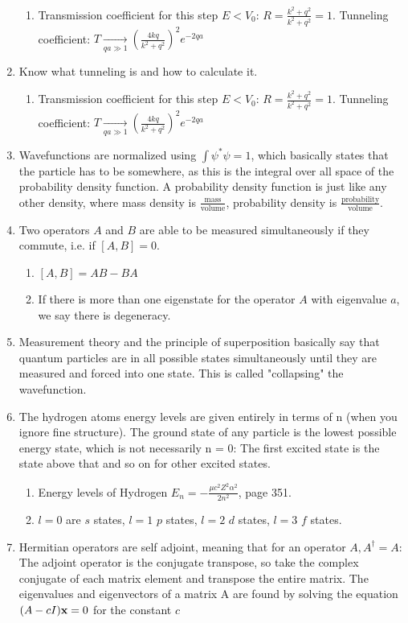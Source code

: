 \documentclass[english]{article}
\begin{document}
\begin{enumerate}
\begin{enumerate}
\item Transmission coefficient for this step $E<V_0$: $R=\frac{k^2+q^2}{k^2+q^2}=1$. Tunneling coefficient: $T\xrightarrow[qa\gg 1]{}\left(\frac{4kq}{k^2+q^2}\right)^2e^{-2qa}$
\end{enumerate}
\item  Know what tunneling is and how to calculate it.
\begin{enumerate}
\item Transmission coefficient for this step $E<V_0$: $R=\frac{k^2+q^2}{k^2+q^2}=1$. Tunneling coefficient: $T\xrightarrow[qa\gg 1]{}\left(\frac{4kq}{k^2+q^2}\right)^2e^{-2qa}$
\end{enumerate}
\item Wavefunctions are normalized using $\int \psi^*\psi=1$, which basically states that the particle has to be somewhere, as this is the integral over all space of the probability density function. A probability density function is just like any other density, where mass density is $\frac{\text{mass}}{\text{volume}}$, probability density is $\frac{\text{probability}}{\text{volume}}$.
\item Two operators $A$ and $B$ are able to be measured simultaneously if they commute, i.e. if $[A,B] = 0$.
\begin{enumerate}
\item $[A,B]=AB-BA$
\item If there is more than one eigenstate for the operator $A$ with eigenvalue $a$, we say there is degeneracy.
\end{enumerate}
\item Measurement theory and the principle of superposition basically say that quantum particles are in all possible states simultaneously until they are measured and forced into one state. This is called "collapsing" the wavefunction.
\item The hydrogen atoms energy levels are given entirely in terms of n (when you ignore fine structure). The ground state of any particle is the lowest possible energy state, which is not necessarily n = 0: The first excited state is the state above that and so on for other excited states.
\begin{enumerate}
\item Energy levels of Hydrogen $E_n=-\frac{\mu c^2 Z^2\alpha^2}{2n^2}$, page 351.
\item $l=0$ are $s$ states, $l=1$ $p$ states, $l=2$ $d$ states, $l=3$ $f$ states.
\end{enumerate}
\item Hermitian operators are self adjoint, meaning that for an operator $A, A^{\dagger} = A$: The adjoint operator is the conjugate transpose, so take the complex conjugate of each matrix element and transpose the entire matrix. The eigenvalues and eigenvectors of a matrix A are found by solving the equation $(A-cI)\vb{x} = 0$ for the constant $c$

\end{enumerate}
\end{document}
